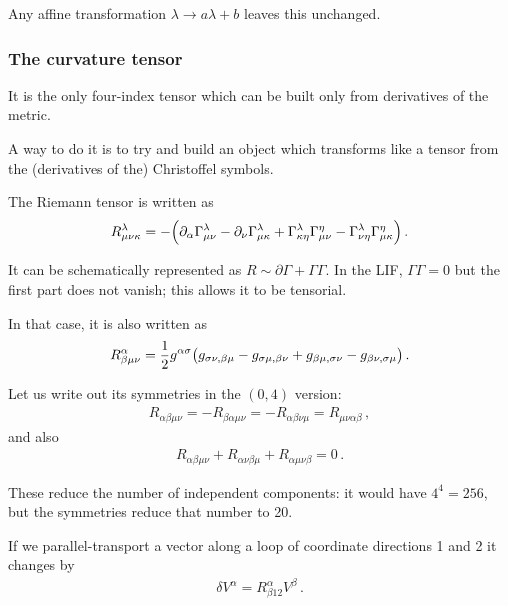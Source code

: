 \documentclass[main.tex]{subfiles}
\begin{document}
Any affine transformation \(\lambda \to a \lambda + b\) leaves this unchanged. 


\subsubsection{The curvature tensor}

It is the only four-index tensor which can be built only from derivatives of the metric. 

A way to do it is to try and build an object which transforms like a tensor from the (derivatives of the) Christoffel symbols. 

The Riemann tensor is written as 
%
\begin{align}
R^{\lambda }_{\mu \nu \kappa } = - \qty( \partial_{\alpha } \Gamma^{\lambda }_{\mu \nu } - \partial_{\nu } \Gamma^{\lambda }_{\mu \kappa } + \Gamma^{\lambda }_{\kappa \eta } \Gamma^{\eta }_{\mu \nu } - \Gamma^{\lambda }_{\nu \eta } \Gamma^{\eta }_{\mu \kappa }) 
\,.
\end{align}

It can be schematically represented as \(R \sim \partial \Gamma + \Gamma \Gamma \). 
In the LIF, \(\Gamma \Gamma= 0\) but the first part does not vanish; this allows it to be tensorial. 

In that case, it is also written as 
%
\begin{align}
R^{\alpha }_{\beta \mu \nu } = \frac{1}{2} g^{\alpha \sigma } \qty(g_{\sigma \nu , \beta \mu } - g_{\sigma \mu , \beta \nu } + g_{\beta \mu , \sigma \nu } - g_{\beta \nu , \sigma \mu })
\,.
\end{align}

Let us write out its symmetries in the \((0, 4)\) version: 
%
\begin{align}
R_{\alpha \beta \mu \nu } = - R_{\beta \alpha \mu \nu } = - R_{\alpha \beta \nu \mu } = R_{\mu \nu \alpha \beta }
\,,
\end{align}
%
and also 
%
\begin{align}
R_{\alpha \beta \mu \nu } + R_{ \alpha \nu \beta \mu } + R_{\alpha \mu \nu \beta } = 0
\,.
\end{align}

These reduce the number of independent components: it would have \(4^{4} = 256\), but the symmetries reduce that number to 20. 

If we parallel-transport a vector along a loop of coordinate directions 1 and 2 it changes by 
%
\begin{align}
\delta V^{\alpha } = R^{\alpha }_{\beta 12} V^{\beta }
\,.
\end{align}
\end{document}
